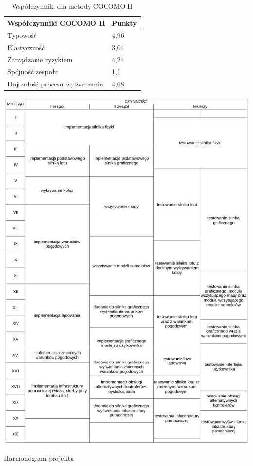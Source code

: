 \documentclass{mwrep}
\begin{document}
\begin{table}
    \begin{center}
        \begin{tabular}{|l|l|} \hline
        \multicolumn{1}{|m{10cm}|}{\centering Współczynniki COCOMO II } &
        \multicolumn{1}{m{2cm}|}{\centering Punkty}                    \\ \hline
        Typowość                        & 4,96 \\
        Elastyczność                    & 3,04 \\
        Zarządzanie ryzykiem            & 4,24 \\
        Spójność zespołu                & 1,1  \\
        Dojrzałość procesu wytwarzania  & 4,68 \\ \hline
        \end{tabular}
    \end{center}
    \caption{Współczynniki dla metody COCOMO II}
\end{table}

\begin{table}
	\centerline{\includegraphics*[scale=0.8]{harmonogram-tabela.pdf}}
	\caption{Harmonogram projektu}
\end{table}
\end{document}
